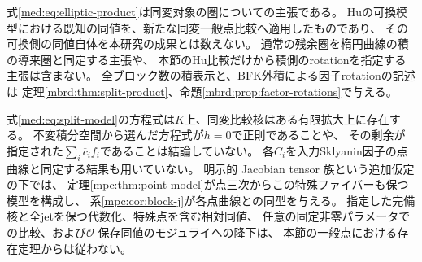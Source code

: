 式\eqref{med:eq:elliptic-product}は同変対象の圏についての主張である。
Huの可換模型における既知の同値を、新たな同変一般点比較へ適用したものであり、
その可換側の同値自体を本研究の成果とは数えない。
通常の残余圏を楕円曲線の積の導来圏と同定する主張や、
本節のHu比較だけから積側のrotationを指定する主張は含まない。
全ブロック数の積表示と、BFK外積による因子rotationの記述は
定理\ref{mbrd:thm:split-product}、命題\ref{mbrd:prop:factor-rotations}で与える。

\begin{remark}[得られた降下の範囲]\label{med:rem:scope}
式\eqref{med:eq:split-model}の方程式は$K$上、同変比較核はある有限拡大上に存在する。
不変積分空間から選んだ方程式が$h=0$で正則であることや、
その剰余が指定された$\sum_i\overline c_if_i$であることは結論していない。
各$C_i$を入力Sklyanin因子の点曲線と同定する結果も用いていない。
明示的 Jacobian tensor 族という追加仮定の下では、
定理\ref{mpc:thm:point-model}が点三次からこの特殊ファイバーも保つ模型を構成し、
系\ref{mpc:cor:block-j}が各点曲線との同型を与える。
指定した完備核と全jetを保つ代数化、特殊点を含む相対同値、
任意の固定非零パラメータでの比較、および$\mathcal O$-保存同値のモジュライへの降下は、
本節の一般点における存在定理からは従わない。
\end{remark}

